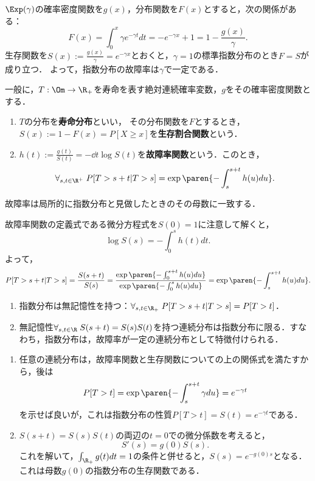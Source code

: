 \documentclass[uplatex,dvipdfmx]{jsreport}
\begin{document}
\begin{proposition}[指数分布の生存関数]
    $\Exp(\gamma)$の確率密度関数を$g(x)$，分布関数を$F(x)$とすると，次の関係がある：
    \[F(x)=\int^x_0\gamma e^{-\gamma t}dt=-e^{-\gamma x}+1=1-\frac{g(x)}{\gamma}.\]
    生存関数を$S(x):=\frac{g(x)}{\gamma}=e^{-\gamma x}$とおくと，$\gamma=1$の標準指数分布のとき$F=S$が成り立つ．
    よって，指数分布の故障率は$\gamma$で一定である．
\end{proposition}

\begin{definition}
    一般に，$T:\Om\to\R_+$を寿命を表す絶対連続確率変数，$g$をその確率密度関数とする．
    \begin{enumerate}
        \item $T$の分布を\textbf{寿命分布}といい，
        その分布関数を$F$とするとき，$S(x):=1-F(x)=P[X\ge x]$を\textbf{生存割合関数}という．
        \item $h(t):=\frac{g(t)}{S(t)}=-\dd{}{t}\log S(t)$を\textbf{故障率関数}という．このとき，
        \[\forall_{s,t\in\R^+}\;P[T>s+t|T>s]=\exp\paren{-\int^{s+t}_sh(u)du}.\]
    \end{enumerate}
    故障率は局所的に指数分布と見做したときのその母数に一致する．
\end{definition}
\begin{Proof}
    故障率関数の定義式である微分方程式を$S(0)=1$に注意して解くと，
    \[\log S(s)=-\int^s_0h(t)dt.\]
    よって，
    \[P[T>s+t|T>s]=\frac{S(s+t)}{S(s)}=\frac{\exp\paren{-\int^{s+t}_0h(u)du}}{\exp\paren{-\int^s_0h(u)du}}=\exp\paren{-\int^{s+t}_sh(u)du}.\]
\end{Proof}

\begin{proposition}[指数分布の無記憶性による特徴付け]\mbox{}
    \begin{enumerate}
        \item 指数分布は無記憶性を持つ：$\forall_{s,t\in\R_+}\;P[T>s+t|T>s]=P[T>t]$．
        \item 無記憶性$\forall_{s,t\in\R}\;S(s+t)=S(s)S(t)$を持つ連続分布は指数分布に限る．すなわち，指数分布は，故障率が一定の連続分布として特徴付けられる．
    \end{enumerate}
\end{proposition}
\begin{Proof}\mbox{}
    \begin{enumerate}
        \item 任意の連続分布は，故障率関数と生存関数についての上の関係式を満たすから，後は
        \[P[T>t]=\exp\paren{-\int^{s+t}_s\gamma du}=e^{-\gamma t}\]
        を示せば良いが，これは指数分布の性質$P[T>t]=S(t)=e^{-\gamma t}$である．
        \item $S(s+t)=S(s)S(t)$の両辺の$t=0$での微分係数を考えると，
        \[S'(s)=g(0)S(s).\]
        これを解いて，$\int_{\R_+}g(t)dt=1$の条件と併せると，$S(s)=e^{-g(0) s}$となる．これは母数$g(0)$の指数分布の生存関数である．
    \end{enumerate}
\end{Proof}
\end{document}
